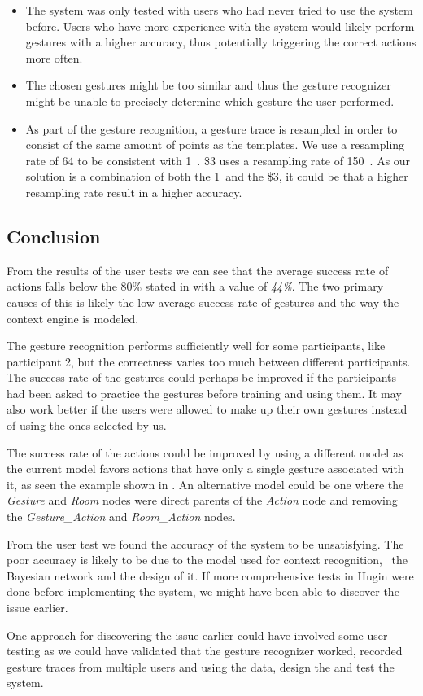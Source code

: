 \begin{itemize}
\item The system was only tested with users who had never tried to use the system before. Users who have more experience with the system would likely perform gestures with a higher accuracy, thus potentially triggering the correct actions more often.
\item The chosen gestures might be too similar and thus the gesture recognizer might be unable to precisely determine which gesture the user performed.
\item As part of the gesture recognition, a gesture trace is resampled in order to consist of the same amount of points as the templates. We use a resampling rate of 64 to be consistent with 1\textcent~\cite{herold20121}. \$3 uses a resampling rate of 150~\cite{threedollar}. As our solution is a combination of both the 1\textcent~and the \$3, it could be that a higher resampling rate result in a higher accuracy.
\end{itemize}

\subsection{Conclusion}
\label{sec:evaluation:user-tests-conclusion}

From the results of the user tests we can see that the average success rate of actions falls below the 80\% stated in  with a value of \emph{44\%}.
The two primary causes of this is likely the low average success rate of gestures and the way the context engine is modeled.

The gesture recognition performs sufficiently well for some participants, like participant 2, but the correctness varies too much between different participants.
The success rate of the gestures could perhaps be improved if the participants had been asked to practice the gestures before training and using them.
It may also work better if the users were allowed to make up their own gestures instead of using the ones selected by us.

The success rate of the actions could be improved by using a different model as the current model favors actions that have only a single gesture associated with it, as seen the example shown in .
An alternative model could be one where the \emph{Gesture} and \emph{Room} nodes were direct parents of the \emph{Action} node and removing the \emph{Gesture\_Action} and \emph{Room\_Action} nodes.

From the user test we found the accuracy of the system to be unsatisfying. The poor accuracy is likely to be due to the model used for context recognition, \ie~the Bayesian network and the design of it. If more comprehensive tests in Hugin were done before implementing the system, we might have been able to discover the issue earlier.

One approach for discovering the issue earlier could have involved some user testing as we could have validated that the gesture recognizer worked, recorded gesture traces from multiple users and using the data, design the and test the system.

